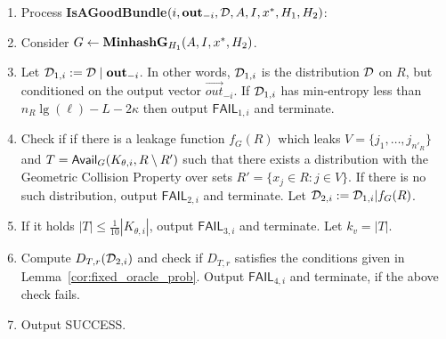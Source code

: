 \begin{enumerate}
\item[] \hspace{-2em} Process \textbf{IsAGoodBundle}$(i, \mathbf{out}_{-i}, {\cal D}, A, I, {x^*}, H_1, H_2)$:
    \item Consider $G \leftarrow {\bf MinhashG}_{H_1}(A, I, {x^*}, H_2)$.
    \item Let ${\cal D}_{1,i} := {\cal D} \mid \mathbf{out}_{-i}$.
    In other words, ${\cal D}_{1,i}$ is the distribution ${\cal D}$ on $R$, but conditioned on the output vector $\vec{out}_{-i}$.
    If ${\cal D}_{1,i}$ has min-entropy
    less than $n_R \lg(\ell) - L - 2\kappa$ then output $\mathsf{FAIL}_{1,i}$ and terminate. 
    \item 
    Check if if there is a leakage function $f_G(R)$ which leaks $V = \{j_1,
    \ldots, j_{n'_R} \}$ and $T = \mathsf{Avail}_G(K_{\theta,i}, R \setminus R')$ such
    that there exists a distribution with the Geometric Collision Property over
    sets $R' = \{x_j \in R : j \in V\}$. If there is no such distribution,
    output $\mathsf{FAIL}_{2,i}$ and terminate. %
    Let ${\cal D}_{2,i} := {\cal D}_{1,i} | f_G(R)$. 
    
    \item If it holds $|T| \le \frac{1}{10} | K_{\theta,i}|$,
    output $\mathsf{FAIL}_{3,i}$ and terminate. 
   Let $k_v = |T|$. 
   \item 
    Compute $D_{T, r}({\cal D}_{2,i})$ and check if $D_{T,r}$ satisfies the conditions given in Lemma~\ref{cor:fixed_oracle_prob}. 
    Output $\mathsf{FAIL}_{4,i}$ and terminate, if the above check fails. 

    \item Output SUCCESS.
\end{enumerate}

